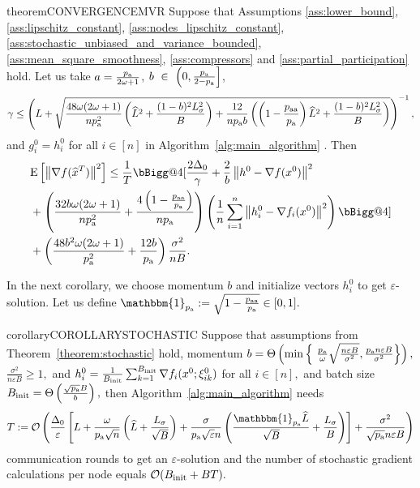 \documentclass{article}
\makeatletter
\newcommand{\algorithmname}{DASHA-PP}
\newcommand*{\probavailable}{\ensuremath{p_{\textnormal{a}}}}
\newcommand*{\probpairaa}{\ensuremath{p_{\textnormal{aa}}}}
\newcommand{\vast}{\bBigg@{4}}
\makeatother
\begin{document}
\begin{restatable}{theorem}{CONVERGENCEMVR}
  \label{theorem:stochastic}
  Suppose that Assumptions \ref{ass:lower_bound}, \ref{ass:lipschitz_constant}, \ref{ass:nodes_lipschitz_constant}, \ref{ass:stochastic_unbiased_and_variance_bounded}, \ref{ass:mean_square_smoothness}, \ref{ass:compressors} and \ref{ass:partial_participation} hold. Let us take $a = \frac{\probavailable}{2\omega + 1}$, $b~\in~\left(0, \frac{\probavailable}{2 - \probavailable}\right]$, 
  $$\gamma \leq \left(L + \sqrt{\frac{48 \omega (2 \omega + 1)}{n \probavailable^2} \left(\widehat{L}^2 + \frac{(1 - b)^2 L_{\sigma}^2}{B}\right) + \frac{12}{n \probavailable b}\left(\left(1 - \frac{\probpairaa}{\probavailable}\right) \widehat{L}^2 + \frac{(1 - b)^2 L_{\sigma}^2}{B}\right)}\right)^{-1},$$
  and $g^{0}_i = h^{0}_i$ for all $i \in [n]$
  in Algorithm~\ref{alg:main_algorithm} \algname{(\algorithmname-MVR)}.
  Then 
\begin{align*}
  &\Exp{\norm{\nabla f(\widehat{x}^T)}^2} \leq \frac{1}{T}\vast[\frac{2 \Delta_0}{\gamma} + \frac{2}{b} \norm{h^{0} - \nabla f(x^{0})}^2 \\
  &+ \left(\frac{32 b \omega (2 \omega + 1)}{n \probavailable^2} + \frac{4 \left(1 - \frac{\probpairaa}{\probavailable}\right)}{n \probavailable}\right)\left(\frac{1}{n}\sum_{i=1}^n\norm{h^{0}_i - \nabla f_i(x^{0})}^2\right)\vast] \\
  &+ \left(\frac{48 b^2 \omega (2 \omega + 1)}{\probavailable^2} + \frac{12 b}{\probavailable}\right) \frac{\sigma^2}{n B}.
\end{align*}
\end{restatable}

In the next corollary, we choose momentum $b$ and initialize vectors $h^{0}_i$ to get $\varepsilon$-solution. Let us define $\mathbbm{1}_{\probavailable} \eqdef \sqrt{1 - \frac{\probpairaa}{\probavailable}} \in [0, 1].$

\begin{restatable}{corollary}{COROLLARYSTOCHASTIC}
  \label{cor:stochastic}
  Suppose that assumptions from Theorem~\ref{theorem:stochastic} hold, momentum $b = \Theta\left(\min \left\{\ \frac{\probavailable}{\omega}\sqrt{\frac{n \varepsilon B}{\sigma^2}}, \frac{\probavailable n \varepsilon B}{\sigma^2}\right\}\right),$ $\frac{\sigma^2}{n \varepsilon B} \geq 1,$
  and $h^{0}_i = \frac{1}{B_{\textnormal{init}}} \sum_{k = 1}^{B_{\textnormal{init}}} \nabla f_i(x^0; \xi^0_{ik})$ for all $i \in [n],$ and batch size $B_{\textnormal{init}} = \Theta\left(\frac{\sqrt{\probavailable} B}{b}\right),$ then Algorithm~\ref{alg:main_algorithm} \algname{(\algorithmname-MVR)} needs
  $$T \eqdef \cO\left(\frac{\Delta_0}{\varepsilon}\left[L + \frac{\omega}{\probavailable\sqrt{n}}\left(\widehat{L} + \frac{L_{\sigma}}{\sqrt{B}}\right) + \frac{\sigma}{\probavailable \sqrt{\varepsilon} n}\left(\frac{\mathbbm{1}_{\probavailable}\widehat{L}}{\sqrt{B}} + \frac{L_\sigma}{B}\right)\right] + \frac{\sigma^2}{\sqrt{\probavailable} n \varepsilon B}\right)$$
  communication rounds to get an $\varepsilon$-solution and the number of stochastic gradient calculations per node equals $\mathcal{O}(B_{\textnormal{init}} + BT).$
\end{restatable}
\end{document}
